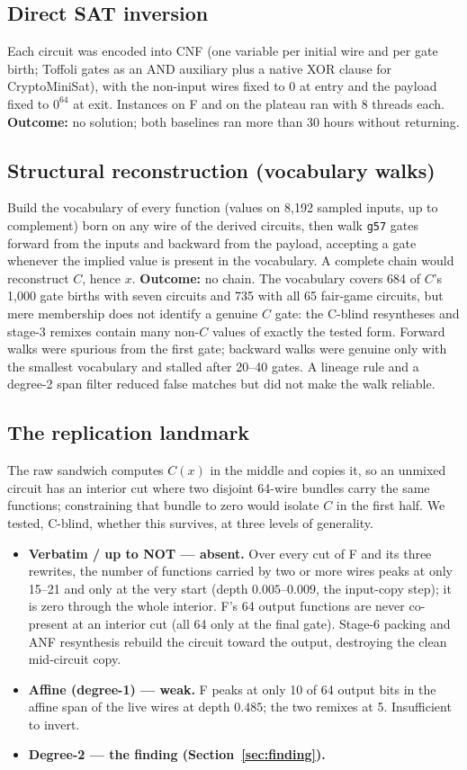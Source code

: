 \documentclass[11pt]{article}
\newcommand{\gate}{\texttt{g57}}
\begin{document}
\subsection{Direct SAT inversion}
Each circuit was encoded into CNF (one variable per initial wire and per gate birth;
Toffoli gates as an AND auxiliary plus a native XOR clause for CryptoMiniSat), with the
non-input wires fixed to $0$ at entry and the payload fixed to $0^{64}$ at exit.
Instances on F and on the plateau ran with 8 threads each.
\textbf{Outcome:} no solution; both baselines ran more than 30 hours without returning.

\subsection{Structural reconstruction (vocabulary walks)}
Build the vocabulary of every function (values on 8{,}192 sampled inputs, up to
complement) born on any wire of the derived circuits, then walk \gate{} gates forward
from the inputs and backward from the payload, accepting a gate whenever the implied
value is present in the vocabulary. A complete chain would reconstruct $C$, hence $x$.
\textbf{Outcome:} no chain. The vocabulary covers 684 of $C$'s 1{,}000 gate births with
seven circuits and 735 with all 65 fair-game circuits, but mere membership does not
identify a genuine $C$ gate: the C-blind resyntheses and stage-3 remixes contain many
non-$C$ values of exactly the tested form. Forward walks were spurious from the first
gate; backward walks were genuine only with the smallest vocabulary and stalled after
20--40 gates. A lineage rule and a degree-2 span filter reduced false matches but did
not make the walk reliable.

\subsection{The replication landmark}
The raw sandwich computes $C(x)$ in the middle and copies it, so an unmixed circuit has
an interior cut where two disjoint 64-wire bundles carry the same functions; constraining
that bundle to zero would isolate $C$ in the first half. We tested, C-blind, whether this
survives, at three levels of generality.
\begin{itemize}[leftmargin=1.4em]
\item \textbf{Verbatim / up to NOT --- absent.} Over every cut of F and its three
  rewrites, the number of functions carried by two or more wires peaks at only 15--21 and
  only at the very start (depth $0.005$--$0.009$, the input-copy step); it is zero through
  the whole interior. F's 64 output functions are never co-present at an interior cut
  (all 64 only at the final gate). Stage-6 packing and ANF resynthesis rebuild the circuit
  toward the output, destroying the clean mid-circuit copy.
\item \textbf{Affine (degree-1) --- weak.} F peaks at only 10 of 64 output bits in the
  affine span of the live wires at depth $0.485$; the two remixes at 5. Insufficient to
  invert.
\item \textbf{Degree-2 --- the finding (Section~\ref{sec:finding}).}
\end{itemize}
\end{document}

